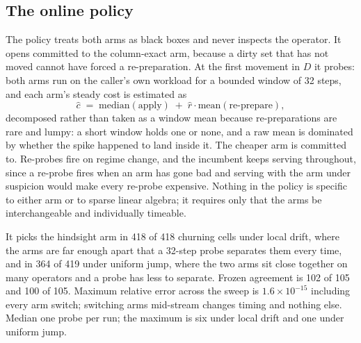 \documentclass{article}
\begin{document}
\begin{table}[tbp]
  \centering
  \caption{Offline prediction under leave-one-operator-out cross-validation, per
  motion model, on the workload mixture (frozen and churning cells scored
  together). Accuracy is reported and is not used as an argument.
  \S\ref{sec:contrast} measures what share of an accuracy gap sits on cells
  whose labels this harness cannot resolve; under a flat $10\%$ parity band the
  share is $4.0\%$ on the two local-drift rows and $21.5\%$ on the two
  uniform-jump rows, and it reaches $87$--$100\%$ on uniform-jump churning
  cells, which are a different scope and are not in this table.}
  \label{tab:predictors}
  \small
  
\end{table}

\subsection{The online policy}
\label{sec:measure}

The policy treats both arms as black boxes and never inspects the operator. It
opens committed to the column-exact arm, because a dirty set that has not moved
cannot have forced a re-preparation. At the first movement in $D$ it probes:
both arms run on the caller's own workload for a bounded window of 32 steps, and
each arm's steady cost is estimated as
\[
  \widehat{c} \;=\; \mathrm{median}(\mathrm{apply}) \;+\;
                    \widehat{r} \cdot \mathrm{mean}(\text{re-prepare}),
\]
decomposed rather than taken as a window mean because re-preparations are rare
and lumpy: a short window holds one or none, and a raw mean is dominated by
whether the spike happened to land inside it. The cheaper arm is committed to.
Re-probes fire on regime change, and the incumbent keeps serving throughout,
since a re-probe fires when an arm has gone bad and serving with the arm under
suspicion would make every re-probe expensive. Nothing in the policy is specific
to either arm or to sparse linear algebra; it requires only that the arms be
interchangeable and individually timeable.

It picks the hindsight arm in 418 of 418 churning cells under local drift, where
the arms are far enough apart that a 32-step probe separates them every time,
and in 364 of 419 under uniform jump, where the two arms sit close together on
many operators and a probe has less to separate. Frozen agreement is 102 of 105
and 100 of 105. Maximum relative error across the sweep is $1.6 \times 10^{-15}$
including every arm switch; switching arms mid-stream changes timing and nothing
else. Median one probe per run; the maximum is six under local drift and one
under uniform jump.
\end{document}
